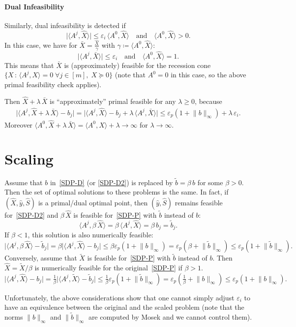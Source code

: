 \documentclass[10pt, a4paper]{article}
\newcommand{\suchthat}{\,:\,}
\newcommand{\abs}[1]{\lvert{#1}\rvert}
\newcommand{\define}{\coloneqq}
\newcommand{\norm}[1]{\lVert{#1}\rVert}
\newcommand{\skal}[2]{\langle{#1},{#2}\rangle}
\begin{document}
\paragraph{Dual Infeasibility}

Similarly, dual infeasibility is detected if
\[
\abs{\skal{A^j}{\hat{X}}} \leq \varepsilon_i\, \skal{A^0}{\hat{X}}
\quad\text{and}\quad \skal{A^0}{\hat{X}} > 0.
\]
In this case, we have for $\bar{X} = \frac{\hat{X}}{\gamma}$ with
$\gamma \define \skal{A^0}{\hat{X}}$:
\[
\abs{\skal{A^j}{\bar{X}}} \leq \varepsilon_i
\quad\text{and}\quad \skal{A^0}{\hat{X}} = 1.
\]
This means that $\bar{X}$ is (approximately) feasible for the recession
cone $\{X \suchthat \skal{A^j}{X} = 0\; \forall j \in [m],\; X \succeq 0\}$
(note that $A^0 = 0$ in this case, so the above primal feasibility check
applies).

Then $\hat{X} + \lambda\, \bar{X}$ is ``approximately'' primal feasible
for any $\lambda \geq 0$, because
\begin{align*}
  \abs{\skal{A^j}{\hat{X} + \lambda\, \bar{X}} - b_j} =
  \abs{\skal{A^j}{\hat{X}} - b_j + \lambda\, \skal{A^j}{\bar{X}}}
  \leq \varepsilon_p (1 + \norm{b}_{\infty}) + \lambda\, \varepsilon_i.
\end{align*}
Moreover
$\skal{A^0}{\hat{X} + \lambda\, \bar{X}} = \skal{A^0}{\hat{X}} + \lambda \to \infty$ for
$\lambda \to \infty$.

\section{Scaling}

Assume that $b$ in~\eqref{SDP-D} (or \eqref{SDP-D2}) is replaced by
$\tilde{b} = \beta\, b$ for some $\beta > 0$. Then the set of optimal
solutions to these problems is the same. In fact, if
$(\hat{X},\hat{y},\hat{S})$ is a primal/dual optimal point, then
$(\hat{y},\hat{S})$ remains feasible for~\eqref{SDP-D2} and $\beta\, \hat{X}$ is
feasible for~\eqref{SDP-P} with $\tilde{b}$ instead of $b$:
\[
\skal{A^j}{\beta\, \hat{X}} = \beta\, \skal{A^j}{\hat{X}} = \beta\,b_j = \tilde{b}_j.
\]
If $\beta < 1$, this solution is also numerically feasible:
\[
\abs{\skal{A^j}{\beta\, \hat{X}} - \tilde{b}_j}
= \beta \abs{\skal{A^j}{\hat{X}} - b_j}
\leq \beta \varepsilon_p (1 + \norm{b}_\infty)
= \varepsilon_p (\beta + \norm{\tilde{b}}_\infty) \leq \varepsilon_p (1 + \norm{\tilde{b}}_\infty).
\]
Conversely, assume that $\tilde{X}$ is feasible for~\eqref{SDP-P} with
$\tilde{b}$ instead of $b$. Then $\hat{X} = \tilde{X}/\beta$ is numerically
feasible for the original~\eqref{SDP-P} if $\beta > 1$.
\[
\abs{\skal{A^j}{\hat{X}} - b_j}
= \tfrac{1}{\beta} \abs{\skal{A^j}{\tilde{X}} - \tilde{b}_j}
\leq \tfrac{1}{\beta} \varepsilon_p (1 + \norm{\tilde{b}}_\infty)
= \varepsilon_p (\tfrac{1}{\beta} + \norm{b}_\infty) \leq \varepsilon_p (1 + \norm{b}_\infty).
\]

Unfortunately, the above considerations show that one cannot simply adjust
$\varepsilon_i$ to have an equivalence between the original and the scaled
problem (note that the norms $\norm{b}_{\infty}$ and
$\norm{\tilde{b}}_{\infty}$ are computed by Mosek and we cannot control
them).
\end{document}
